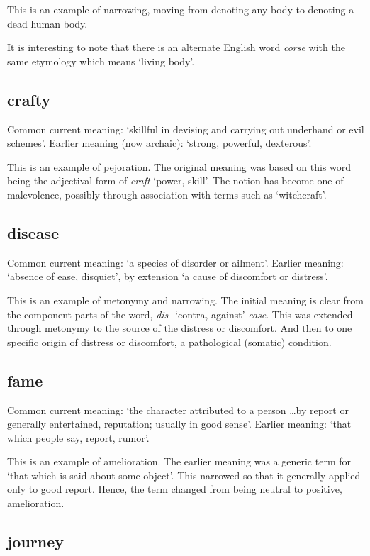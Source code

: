 \documentclass[12pt]{article}
\begin{document}
This is an example of narrowing, moving from denoting any body to denoting a dead human body.

It is interesting to note that there is an alternate English word {\it corse} with the same etymology which means `living body'.

\subsection{crafty}

Common current meaning: `skillful in devising and carrying out underhand or evil schemes'. Earlier meaning (now archaic): `strong, powerful, dexterous'.

This is an example of pejoration. The original meaning was based on this word being the adjectival form of {\it craft} `power, skill'. The notion has become one of malevolence, possibly through association with terms such as `witchcraft'.

\subsection{disease}

Common current meaning: `a species of disorder or ailment'. Earlier meaning: `absence of ease, disquiet', by extension `a cause of discomfort or distress'.

This is an example of metonymy and narrowing. The initial meaning is clear from the component parts of the word, {\it dis-} `contra, against' {\it ease}. This was extended through metonymy to the source of the distress or discomfort. And then to one specific origin of distress or discomfort, a pathological (somatic) condition.

\subsection{fame}

Common current meaning: `the character attributed to a person \ldots by report or generally entertained, reputation; usually in good sense'. Earlier meaning: `that which people say, report, rumor'.

This is an example of amelioration. The earlier meaning was a generic term for `that which is said about some object'. This narrowed so that it generally applied only to good report. Hence, the term changed from being neutral to positive, amelioration.

\subsection{journey}
\end{document}
